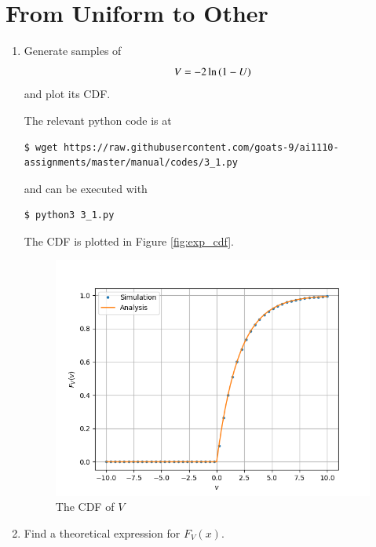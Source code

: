 \documentclass[journal,12pt,twocolumn]{IEEEtran}
\renewcommand\thesection{\arabic{section}}
\begin{document}
\section{From Uniform to Other}
\begin{enumerate}[label=\thesection.\arabic*
,ref=\thesection.\theenumi]
%
\item
Generate samples of 
%
\begin{equation}
V = -2\ln\left(1-U\right)
\end{equation}
%
and plot its CDF. 

\solution
The relevant python code is at
\begin{lstlisting}
$ wget https://raw.githubusercontent.com/goats-9/ai1110-assignments/master/manual/codes/3_1.py
\end{lstlisting}
and can be executed with
\begin{lstlisting}
$ python3 3_1.py
\end{lstlisting}
The CDF is plotted in Figure \eqref{fig:exp_cdf}.
\begin{figure}[!htb] 
\centering
\includegraphics[width=\columnwidth]{./figs/3_1.png}
\caption{The CDF of $V$}
\label{fig:exp_cdf}
\end{figure}

\item Find a theoretical expression for $F_V(x)$.


\end{enumerate}
\end{document}
